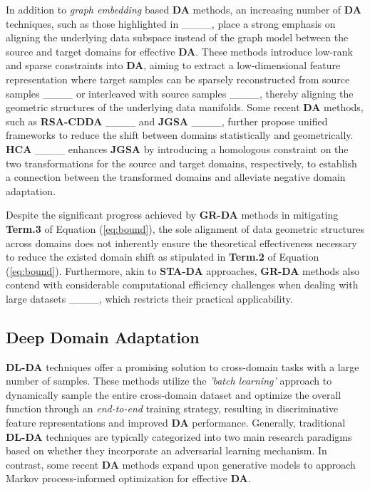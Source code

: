 In addition to \textit{graph embedding} based \textbf{DA} methods, an increasing number of \textbf{DA} techniques, such as those highlighted in ____, place a strong emphasis on aligning the underlying data subspace instead of the graph model between the source and target domains for effective \textbf{DA}. These methods introduce low-rank and sparse constraints into \textbf{DA}, aiming to extract a low-dimensional feature representation where target samples can be sparsely reconstructed from source samples ____ or interleaved with source samples ____, thereby aligning the geometric structures of the underlying data manifolds. Some recent \textbf{DA} methods, such as \textbf{RSA-CDDA} ____ and \textbf{JGSA} ____, further propose unified frameworks to reduce the shift between domains statistically and geometrically. \textbf{HCA} ____ enhances \textbf{JGSA} by introducing a homologous constraint on the two transformations for the source and target domains, respectively, to establish a connection between the transformed domains and alleviate negative domain adaptation. 







Despite the significant progress achieved by \textbf{GR-DA} methods in mitigating \textbf{Term.3} of Equation (\ref{eq:bound}), the sole alignment of data geometric structures across domains does not inherently ensure the theoretical effectiveness necessary to reduce the existed domain shift as stipulated in \textbf{Term.2} of Equation (\ref{eq:bound}). Furthermore, akin to \textbf{STA-DA} approaches, \textbf{GR-DA} methods also contend with considerable computational efficiency challenges when dealing with large datasets ____, which restricts their practical applicability.



\subsection{Deep Domain Adaptation}
\label{subsect: Deep DA}



\textbf{DL-DA} techniques offer a promising solution to cross-domain tasks with a large number of samples. These methods utilize the \textit{'batch learning'} approach to dynamically sample the entire cross-domain dataset and optimize the overall function through an \textit{end-to-end} training strategy, resulting in discriminative feature representations and improved \textbf{DA} performance. Generally, traditional \textbf{DL-DA} techniques are typically categorized into two main research paradigms based on whether they incorporate an adversarial learning mechanism. In contrast, some recent \textbf{DA} methods expand upon generative models to approach Markov process-informed optimization for effective \textbf{DA}.


